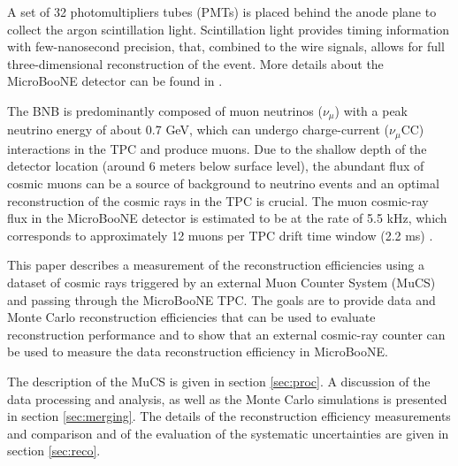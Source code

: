\documentclass[a4paper,11pt]{article}
\begin{document}
A set of 32 photomultipliers tubes (PMTs) is placed behind the anode plane to collect the argon scintillation light. Scintillation light provides timing information with few-nanosecond precision, that, combined to the wire signals, allows for full three-dimensional reconstruction of the event. More details about the MicroBooNE detector can be found in \cite{detector}.

The BNB is predominantly composed of muon neutrinos ($\nu_{\mu}$) with a peak neutrino energy of about 0.7 GeV, which can undergo charge-current ($\nu_{\mu}$CC) interactions in the TPC and produce muons. Due to the shallow depth of the detector location (around 6 meters below surface level), the abundant flux of cosmic muons can be a source of background to neutrino events and an optimal reconstruction of the cosmic rays in the TPC is crucial. The muon cosmic-ray flux in the MicroBooNE detector is estimated to be at the rate of 5.5 kHz, which corresponds to approximately 12 muons per TPC drift time window (2.2 ms) \cite{cosmic}.

This paper describes a measurement of the reconstruction efficiencies using a dataset of cosmic rays triggered by an external Muon Counter System (MuCS) and passing through the MicroBooNE TPC. The goals are to provide data and Monte Carlo reconstruction efficiencies that can be used to evaluate reconstruction performance and to show that an external cosmic-ray counter can be used to measure the data reconstruction efficiency in MicroBooNE.

The description of the MuCS is given in section \ref{sec:proc}. A discussion of the data processing and analysis, as well as the Monte Carlo simulations is presented in section \ref{sec:merging}. The details of the reconstruction efficiency measurements and comparison and of the evaluation of the systematic uncertainties are given in section \ref{sec:reco}.


\end{document}
